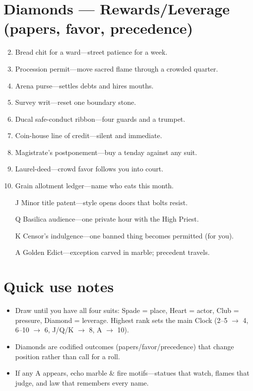 \section*{Diamonds --- Rewards/Leverage (papers, favor, precedence)}
\label{sec:ecktoria-rewards}
\begin{enumerate}
\setcounter{enumi}{1}
\item Bread chit for a ward---street patience for a week.
\item Procession permit---move sacred flame through a crowded quarter.
\item Arena purse---settles debts and hires mouths.
\item Survey writ---reset one boundary stone.
\item Ducal safe-conduct ribbon---four guards and a trumpet.
\item Coin-house line of credit---silent and immediate.
\item Magistrate's postponement---buy a tenday against any suit.
\item Laurel-deed---crowd favor follows you into court.
\item Grain allotment ledger---name who eats this month.
\item[J] Minor title patent---style opens doors that bolts resist.
\item[Q] Basilica audience---one private hour with the High Priest.
\item[K] Censor's indulgence---one banned thing becomes permitted (for you).
\item[A] Golden Edict---exception carved in marble; precedent travels.
\end{enumerate}

\section*{Quick use notes}
\label{sec:ecktoria-quick-use}
\begin{itemize}
\item Draw until you have all four suits: Spade = place, Heart = actor, Club = pressure, Diamond = leverage. Highest rank sets the main Clock (2--5 $\rightarrow$ 4, 6--10 $\rightarrow$ 6, J/Q/K $\rightarrow$ 8, A $\rightarrow$ 10).
\item Diamonds are codified outcomes (papers/favor/precedence) that change position rather than call for a roll.
\item If any A appears, echo marble \& fire motifs---statues that watch, flames that judge, and law that remembers every name.
\end{itemize}


